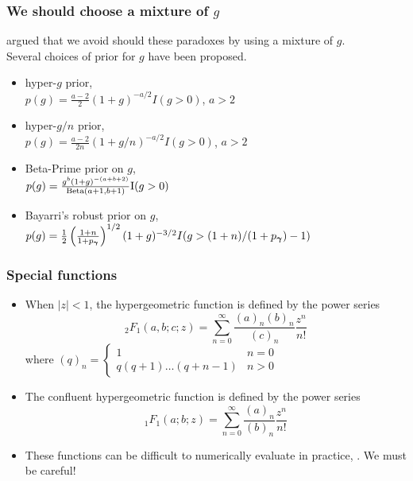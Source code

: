 \documentclass{beamer}
\begin{document}
\begin{frame}
	\frametitle{We should choose a mixture of $g$}
	\cite{Liang2008} argued that we avoid should these paradoxes by using a mixture of $g$. \\
	Several choices of prior for $g$	have been proposed.
	\small
	\begin{itemize}
		\item hyper-$g$ prior, \cite{Liang2008}\\
		$p(g) = \frac{a-2}{2} (1 + g)^{-a/2} I(g > 0)$, $a > 2$
		\item hyper-$g/n$ prior, \cite{Liang2008}\\
		$p(g) = \frac{a-2}{2n} (1 + g/n)^{-a/2} I(g > 0)$, $a > 2$ 
		\item Beta-Prime prior on $g$, \cite{Maruyama2011} \\
		$p(g) = \frac{g^b (1 + g)^{-(a + b + 2)}}{\text{Beta}(a + 1, b + 1)} \text{I}(g > 0)$
		\item Bayarri's robust prior on $g$, \cite{Bayarri2012} \\
		$p(g) = \frac{1}{2} \left(  \frac{1 + n}{1 + p_{\boldsymbol \gamma}} \right)^{1/2} (1 + g)^{-3/2} I(g > (1 + n)/(1 + p_{\boldsymbol \gamma}) - 1)$
	\end{itemize}
\end{frame}


\begin{frame}
	\frametitle{Special functions}
	\begin{itemize}
		\item When $|z| < 1$, the hypergeometric function is defined by the power series
					\[
						{}_2 F_1 (a, b; c; z) = \sum_{n=0}^\infty \frac{(a)_n (b)_n}{(c)_n} \frac{z^n}{n!}
					\]
					where
					$(q)_n = \begin{cases}
						1 & n = 0 \\
						q (q + 1) \ldots (q + n - 1) & n > 0
					\end{cases}$
		\item The confluent hypergeometric function is defined by the power series
					\[
						{}_1 F_1 (a; b; z) = \sum_{n=0}^\infty \frac{(a)_n}{(b)_n} \frac{z^n}{n!}
					\]
		\item These functions can be difficult to numerically evaluate in practice, \cite{Press:2007:NRE:1403886}.
					We must be careful!
	\end{itemize}
\end{frame}
\end{document}
